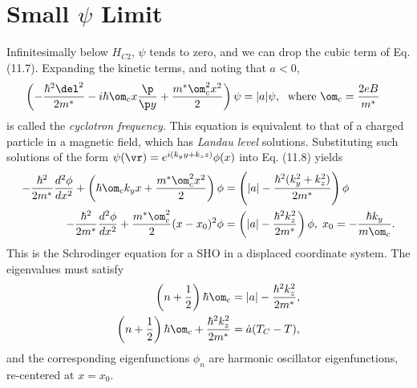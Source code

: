 \documentclass[qo.tex]{subfiles}
\begin{document}
\section{Small \texorpdfstring{$\psi$}{psi} Limit}
Infinitesimally below $H_{C2}$, $\psi$ tends to zero, and we can drop the cubic term of Eq. (11.7).
Expanding the kinetic terms, and noting that $a<0$,
\begin{align}
    \left(-\frac{\hbar^2\del^2}{2m^*} - i\hbar\om_cx\frac{\p}{\p y} + \frac{m^*\om_c^2x^2}{2}\right)\psi &= |a|\psi,\; \text{ where } \om_c = \frac{2eB}{m^*}
\end{align}
is called the \emph{cyclotron frequency}.
This equation is equivalent to that of a charged particle in a magnetic field, which has \emph{Landau level} solutions. 
Substituting such solutions of the form $\psi(\vr)=e^{i(k_yy+k_zz)}\phi(x)$ into Eq. (11.8) yields
\begin{align}
    -\frac{\hbar^2}{2m^*}\frac{d^2\phi}{dx^2} + \left(\hbar\om_ck_yx+\frac{m^*\om_c^2x^2}{2}\right)\phi &= \left(|a| - \frac{\hbar^2(k_y^2+k_z^2)}{2m^*}\right)\phi \\
    -\frac{\hbar^2}{2m^*}\frac{d^2\phi}{dx^2}+\frac{m^*\om_c^2}{2}(x-x_0)^2\phi &= \left(|a|-\frac{\hbar^2k_z^2}{2m^*}\right)\phi,\; x_0 = -\frac{\hbar k_y}{m\om_c}.
\end{align}
This is the Schrodinger equation for a SHO in a displaced coordinate system. 
The eigenvalues must satisfy
\begin{align}
    \left(n+\frac12\right)\hbar\om_c &= |a|-\frac{\hbar^2k_z^2}{2m^*},\\
    \left(n+\frac12\right)\hbar\om_c + \frac{\hbar^2k_z^2}{2m^*} &= \dot{a}(T_C-T),
\end{align}
and the corresponding eigenfunctions $\phi_n$ are harmonic oscillator eigenfunctions, re-centered at $x=x_0$.
\end{document}
